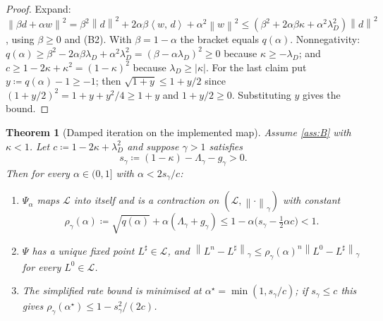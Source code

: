 \documentclass[11pt,a4paper]{article}
\theoremstyle{plain}
\newtheorem{theorem}{Theorem}[section]
\theoremstyle{definition}
\theoremstyle{definition}
\newcommand{\norm}[1]{\left\lVert #1 \right\rVert}
\newcommand{\abs}[1]{\left\lvert #1 \right\rvert}
\newcommand{\ip}[2]{\left\langle #1,\, #2 \right\rangle}
\newcommand{\Lev}{L}
\newcommand{\Psimap}{\Psi}
\newcommand{\Psal}{\Psi_\alpha}
\newcommand{\Lset}{\mathcal{L}}
\begin{document}
\begin{proof}
Expand: $\norm{\beta d + \alpha w}^2 = \beta^2 \norm{d}^2 + 2\alpha\beta \ip{w}{d} + \alpha^2 \norm{w}^2 \le (\beta^2 + 2\alpha\beta\kappa + \alpha^2 \lambda_D^2) \norm{d}^2$, using $\beta \ge 0$ and (B2). With $\beta = 1 - \alpha$ the bracket equals $q(\alpha)$. Nonnegativity: $q(\alpha) \ge \beta^2 - 2\alpha\beta\lambda_D + \alpha^2\lambda_D^2 = (\beta - \alpha\lambda_D)^2 \ge 0$ because $\kappa \ge -\lambda_D$; and $c \ge 1 - 2\kappa + \kappa^2 = (1-\kappa)^2$ because $\lambda_D \ge \abs{\kappa}$. For the last claim put $y \coloneqq q(\alpha) - 1 \ge -1$; then $\sqrt{1 + y} \le 1 + y/2$ since $(1 + y/2)^2 = 1 + y + y^2/4 \ge 1 + y$ and $1 + y/2 \ge 0$. Substituting $y$ gives the bound.
\end{proof}

\begin{theorem}[Damped iteration on the implemented map]\label{thm:implemented}
Assume \cref{ass:B} with $\kappa < 1$. Let $c \coloneqq 1 - 2\kappa + \lambda_D^2$ and suppose $\gamma > 1$ satisfies
\[
  s_\gamma \coloneqq (1 - \kappa) - \Lambda_\gamma - g_\gamma > 0 .
\]
Then for every $\alpha \in (0, 1]$ with $\alpha < 2 s_\gamma / c$:
\begin{enumerate}
\item[(a)] $\Psal$ maps $\Lset$ into itself and is a contraction on $(\Lset, \norm{\cdot}_\gamma)$ with constant
\[
  \rho_\gamma(\alpha) \coloneqq \sqrt{q(\alpha)} + \alpha (\Lambda_\gamma + g_\gamma) \le 1 - \alpha \bigl( s_\gamma - \tfrac12 \alpha c \bigr) < 1 .
\]
\item[(b)] $\Psimap$ has a unique fixed point $\Lev^\sharp \in \Lset$, and $\norm{\Lev^n - \Lev^\sharp}_\gamma \le \rho_\gamma(\alpha)^n \norm{\Lev^0 - \Lev^\sharp}_\gamma$ for every $\Lev^0 \in \Lset$.
\item[(c)] The simplified rate bound is minimised at $\alpha^\star = \min(1, s_\gamma / c)$; if $s_\gamma \le c$ this gives $\rho_\gamma(\alpha^\star) \le 1 - s_\gamma^2 / (2c)$.
\end{enumerate}
\end{theorem}
\end{document}
